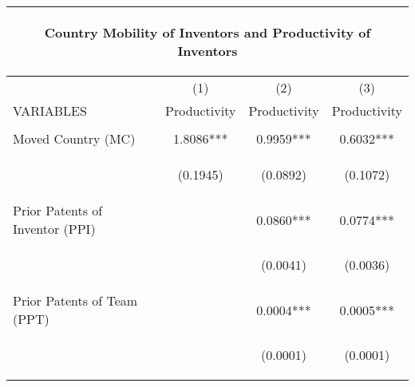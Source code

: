 \begin{center}
\begin{tabular}{lccc}
\multicolumn{4}{c}{\begin{large}Country Mobility of Inventors and Productivity of Inventors\end{large}} \\ \hline
 & (1) & (2) & (3) \\
VARIABLES & Productivity & Productivity & Productivity \\ \hline
\vspace{4pt} & \begin{footnotesize}\end{footnotesize} & \begin{footnotesize}\end{footnotesize} & \begin{footnotesize}\end{footnotesize} \\
Moved Country (MC) & 1.8086*** & 0.9959*** & 0.6032*** \\
\vspace{4pt} & \begin{footnotesize}(0.1945)\end{footnotesize} & \begin{footnotesize}(0.0892)\end{footnotesize} & \begin{footnotesize}(0.1072)\end{footnotesize} \\
Prior Patents of Inventor (PPI) &  & 0.0860*** & 0.0774*** \\
\vspace{4pt} & \begin{footnotesize}\end{footnotesize} & \begin{footnotesize}(0.0041)\end{footnotesize} & \begin{footnotesize}(0.0036)\end{footnotesize} \\
Prior Patents of Team (PPT) &  & 0.0004*** & 0.0005*** \\
\vspace{4pt} & \begin{footnotesize}\end{footnotesize} & \begin{footnotesize}(0.0001)\end{footnotesize} & \begin{footnotesize}(0.0001)\end{footnotesize} \\

\end{tabular}
\end{center}
